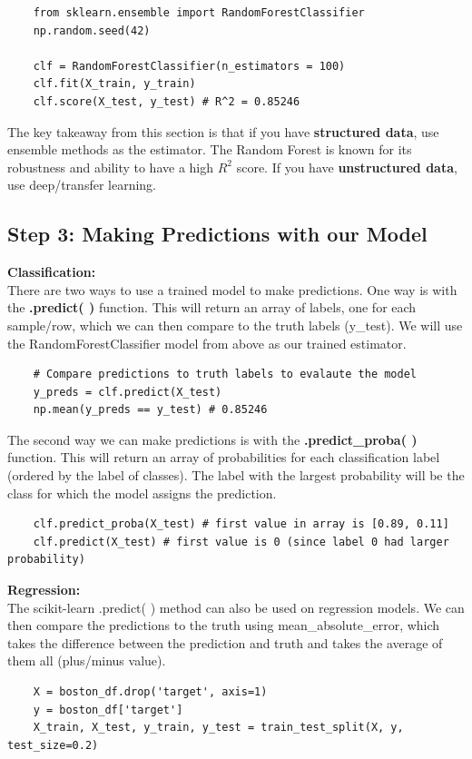 \documentclass[11pt, a4paper]{article}
\begin{document}
\begin{spacing}{1.1}
	\begin{lstlisting}
	from sklearn.ensemble import RandomForestClassifier
	np.random.seed(42)
	
	clf = RandomForestClassifier(n_estimators = 100)
	clf.fit(X_train, y_train)
	clf.score(X_test, y_test) # R^2 = 0.85246 \end{lstlisting} \vspace*{1mm}
	The key takeaway from this section is that if you have \textbf{structured data}, use ensemble methods as the estimator. The Random Forest is known for its robustness and ability to have a high $R^2$ score. If you have \textbf{unstructured data}, use deep/transfer learning.
	\subsection{Step 3: Making Predictions with our Model}
	\textbf{Classification:} \vspace*{1mm} \\
	There are two ways to use a trained model to make predictions. One way is with the \textbf{.predict( )} function. This will return an array of labels, one for each sample/row, which we can then compare to the truth labels (y\_test). We will use the RandomForestClassifier model from above as our trained estimator. 
	\begin{lstlisting}
	# Compare predictions to truth labels to evalaute the model
	y_preds = clf.predict(X_test)
	np.mean(y_preds == y_test) # 0.85246 \end{lstlisting} \vspace*{1mm}
	The second way we can make predictions is with the \textbf{.predict\_proba( )} function. This will return an array of probabilities for each classification label (ordered by the label of classes). The label with the largest probability will be the class for which the model assigns the prediction. 
	\begin{lstlisting}
	clf.predict_proba(X_test) # first value in array is [0.89, 0.11]
	clf.predict(X_test) # first value is 0 (since label 0 had larger probability) \end{lstlisting} \vspace*{1mm}
	\textbf{Regression:} \vspace*{1mm} \\
	The scikit-learn .predict( ) method can also be used on regression models. We can then compare the predictions to the truth using mean\_absolute\_error, which takes the difference between the prediction and truth and takes the average of them all (plus/minus value).
	\begin{lstlisting}
	X = boston_df.drop('target', axis=1)
	y = boston_df['target']
	X_train, X_test, y_train, y_test = train_test_split(X, y, test_size=0.2)
	

\end{lstlisting}
\end{spacing}
\end{document}
